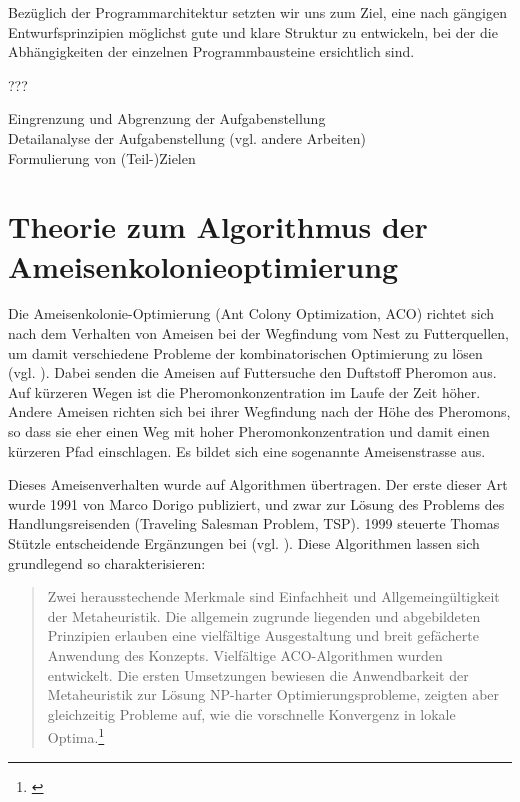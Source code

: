 Bezüglich der Programmarchitektur setzten wir uns zum Ziel, eine nach gängigen Entwurfsprinzipien möglichst gute und klare Struktur zu entwickeln, bei der die Abhängigkeiten der einzelnen Programmbausteine ersichtlich sind.

???

Eingrenzung und Abgrenzung der Aufgabenstellung \\

Detailanalyse der Aufgabenstellung (vgl. andere Arbeiten) \\

Formulierung von (Teil-)Zielen \\

\vspace*{1cm}


\section{Theorie zum Algorithmus der Ameisenkolonieoptimierung} 

Die Ameisenkolonie-Optimierung (Ant Colony Optimization, ACO) richtet sich nach dem Verhalten von Ameisen bei der Wegfindung vom Nest zu Futterquellen, um damit verschiedene Probleme der kombinatorischen Optimierung zu lösen (vgl. \cite[S. 1]{sch-koa}). Dabei senden die Ameisen auf Futtersuche den Duftstoff Pheromon aus. Auf kürzeren Wegen ist die Pheromonkonzentration im Laufe der Zeit höher. Andere Ameisen richten sich bei ihrer Wegfindung nach der Höhe des Pheromons, so dass sie eher einen Weg mit hoher Pheromonkonzentration und damit einen kürzeren Pfad einschlagen. Es bildet sich eine sogenannte Ameisenstrasse aus.

Dieses Ameisenverhalten wurde auf Algorithmen übertragen. Der erste dieser Art wurde 1991 von Marco Dorigo publiziert, und zwar zur Lösung des Problems des Handlungsreisenden (Traveling Salesman Problem, TSP). 1999 steuerte Thomas Stützle entscheidende Ergänzungen bei (vgl. \cite{ds-ant, wiki-antalg}). Diese Algorithmen lassen sich grundlegend so charakterisieren: \blockquote{Zwei herausstechende Merkmale sind Einfachheit und Allgemeingültigkeit der Metaheuristik. Die allgemein zugrunde liegenden und abgebildeten Prinzipien erlauben eine vielfältige Ausgestaltung und breit gefächerte Anwendung des Konzepts. Vielfältige ACO-Algorithmen wurden entwickelt. Die ersten Umsetzungen bewiesen die Anwendbarkeit der Metaheuristik zur Lösung NP-harter Optimierungsprobleme, zeigten aber gleichzeitig Probleme auf, wie die vorschnelle Konvergenz in lokale Optima.\footnote{\cite[S. 19]{sch-koa}}}


